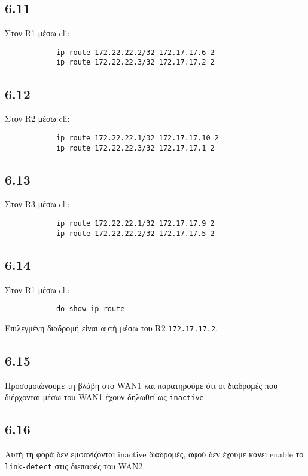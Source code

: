 \documentclass[a4paper, 12pt]{article}
\begin{document}
	\subsection*{6.11}
		Στον R1 μέσω cli:
		
		\begin{verbatim}
			ip route 172.22.22.2/32 172.17.17.6 2
			ip route 172.22.22.3/32 172.17.17.2 2
		\end{verbatim}
		
	\subsection*{6.12}
		Στον R2 μέσω cli:
		
		\begin{verbatim}
			ip route 172.22.22.1/32 172.17.17.10 2
			ip route 172.22.22.3/32 172.17.17.1 2
		\end{verbatim}


	\subsection*{6.13}
		Στον R3 μέσω cli:
		
		\begin{verbatim}
			ip route 172.22.22.1/32 172.17.17.9 2
			ip route 172.22.22.2/32 172.17.17.5 2
		\end{verbatim}
		
	\subsection*{6.14}
		Στον R1 μέσω cli:
		
		\begin{verbatim}
			do show ip route
		\end{verbatim}
		
		Επιλεγμένη διαδρομή είναι αυτή μέσω του R2 \verb|172.17.17.2|. 

	\subsection*{6.15}
		Προσομοιώνουμε τη βλάβη στο WAN1 και παρατηρούμε ότι οι διαδρομές που διέρχονται μέσω του WAN1 έχουν δηλωθεί ως \verb|inactive|.

	\subsection*{6.16}
		Αυτή τη φορά δεν εμφανίζονται inactive διαδρομές, αφού δεν έχουμε κάνει enable το \verb|link-detect| στις διεπαφές του WAN2.
\end{document}
